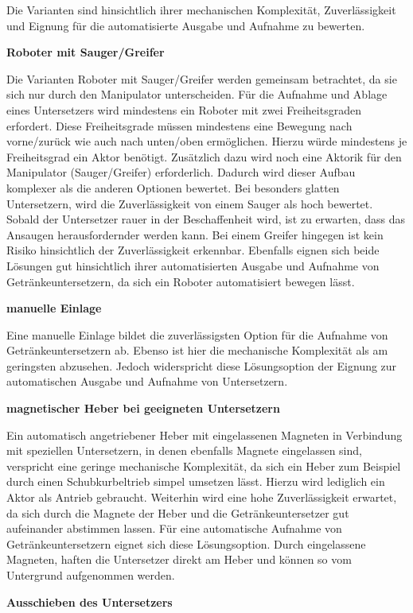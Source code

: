 \documentclass[
  a4paper,
  12pt,
  DIV=12,        %
  parskip=half,  %
  headings=small %
]{scrartcl}
\theoremstyle{definition}
\theoremstyle{definition}
\begin{document}
Die Varianten sind hinsichtlich ihrer mechanischen Komplexität,
Zuverlässigkeit und Eignung für die automatisierte Ausgabe und Aufnahme
zu bewerten.

\textbf{Roboter mit Sauger/Greifer}

Die Varianten Roboter mit Sauger/Greifer werden gemeinsam betrachtet, da sie
sich nur durch den Manipulator unterscheiden. Für die Aufnahme und Ablage eines
Untersetzers wird mindestens ein Roboter mit zwei Freiheitsgraden erfordert.
Diese Freiheitsgrade müssen mindestens eine Bewegung nach vorne/zurück wie auch
nach unten/oben ermöglichen. Hierzu würde mindestens je Freiheitsgrad ein Aktor benötigt.
Zusätzlich dazu wird noch eine Aktorik für den Manipulator (Sauger/Greifer) erforderlich.
Dadurch wird dieser Aufbau komplexer als die anderen Optionen bewertet. Bei besonders glatten
Untersetzern, wird die Zuverlässigkeit von einem Sauger als hoch bewertet. Sobald der
Untersetzer rauer in der Beschaffenheit wird, ist zu erwarten, dass das Ansaugen herausfordernder
werden kann. Bei einem Greifer hingegen ist kein Risiko hinsichtlich der Zuverlässigkeit erkennbar.
Ebenfalls eignen sich beide Lösungen gut hinsichtlich ihrer automatisierten Ausgabe und Aufnahme
von Getränkeuntersetzern, da sich ein Roboter automatisiert bewegen lässt.

\textbf{manuelle Einlage}

Eine manuelle Einlage bildet die zuverlässigsten Option für die Aufnahme von Getränkeuntersetzern ab.
Ebenso ist hier die mechanische Komplexität als am geringsten abzusehen. Jedoch widerspricht
diese Lösungsoption der Eignung zur automatischen Ausgabe und Aufnahme von Untersetzern.

\textbf{magnetischer Heber bei geeigneten Untersetzern}\nopagebreak[4]

Ein automatisch angetriebener Heber mit eingelassenen Magneten in Verbindung mit
speziellen Untersetzern, in denen ebenfalls Magnete eingelassen sind, verspricht eine geringe
mechanische Komplexität, da sich ein Heber zum Beispiel durch einen Schubkurbeltrieb simpel
umsetzen lässt. Hierzu wird lediglich ein Aktor als Antrieb gebraucht. 
Weiterhin wird eine hohe Zuverlässigkeit erwartet, da sich durch die Magnete der Heber und 
die Getränkeuntersetzer gut aufeinander abstimmen lassen.
Für eine automatische Aufnahme von Getränkeuntersetzern eignet sich diese Lösungsoption.
Durch eingelassene Magneten, haften die Untersetzer direkt am Heber und können so vom Untergrund
aufgenommen werden.

\textbf{Ausschieben des Untersetzers}
\end{document}
